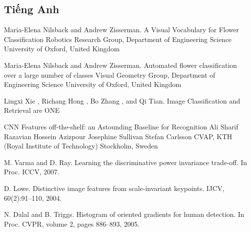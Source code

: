 \documentclass[12pt]{report}
\begin{document}
		\begin{thebibliography}{9}
																																																																																													
			\section*{Tiếng Anh}
																																																																																										
			Maria-Elena Nilsback and Andrew Zisserman. A Visual Vocabulary for Flower Classification Robotics Research Group, Department of Engineering Science University of Oxford, United Kingdom													
																																																																																													
			Maria-Elena Nilsback and Andrew Zisserman. Automated flower classification over a large number of classes Visual Geometry Group, Department of Engineering Science University of Oxford, United Kingdom
																																																																																										
			Lingxi Xie , Richang Hong , Bo Zhang , and Qi Tian. Image Classification and Retrieval are ONE
																																																																																										
			CNN Features off-the-shelf: an Astounding Baseline for Recognition Ali Sharif Razavian Hossein Azizpour Josephine Sullivan Stefan Carlsson CVAP, KTH (Royal Institute of Technology) Stockholm, Sweden
																																																																																									
			M. Varma and D. Ray. Learning the discriminative power invariance trade-off. In Proc. ICCV, 2007.
																																																																																				
			D. Lowe. Distinctive image features from scale-invariant keypoints. IJCV, 60(2):91–110, 2004.
																																																																																												
			N. Dalal and B. Triggs. Histogram of oriented gradients for human detection. In Proc. CVPR, volume 2, pages 886–893, 2005.
																																																																																										

\end{thebibliography}
\end{document}
